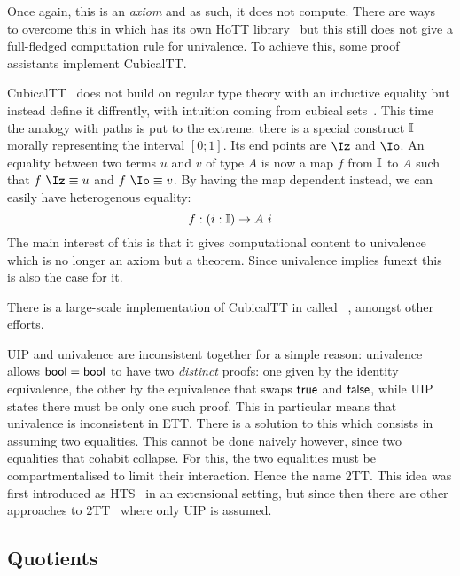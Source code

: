 Once again, this is an \emph{axiom} and as such, it does not compute.
There are ways~ to overcome this in
\Coq which has its own \acrshort{HoTT} library~
but this still does not give a full-fledged computation rule for univalence.
To achieve this, some proof assistants implement \acrlong{CubicalTT}.

 \acrshort{CubicalTT}~
does not build on regular type theory with an inductive equality but instead
define it diffrently, with intuition coming from cubical
sets~.
This time the analogy with paths is put to the extreme: there is a special
construct \(\mathbb{I}\) morally representing the interval \([0;1]\). Its end points
are \(\Iz\) and \(\Io\).
An equality between two terms \(u\) and \(v\) of type \(A\) is now a map \(f\)
from \(\mathbb{I}\) to \(A\) such that \(f\ \Iz \equiv u\) and \(f\ \Io \equiv v\).
By having the map dependent instead, we can easily have heterogenous equality:
\[
  f : (i : \mathbb{I}) \to A\ i
\]
The main interest of this is that it gives computational content to univalence
which is no longer an axiom but a theorem. Since univalence implies
\acrshort{funext} this is also the case for it.

There is a large-scale implementation of \acrshort{CubicalTT} in
\Agda called ~,
amongst other efforts.


\acrshort{UIP} and univalence are inconsistent together for a simple reason:
univalence allows \(\mathsf{bool} = \mathsf{bool}\) to have two \emph{distinct} proofs: one
given by the identity equivalence, the other by the equivalence that swaps
\(\mathsf{true}\) and \(\mathsf{false}\), while \acrshort{UIP} states there must be only one
such proof.
This in particular means that univalence is inconsistent in \acrshort{ETT}.
There is a solution to this which consists in assuming two equalities.
This cannot be done naively however, since two equalities that cohabit
collapse.
For this, the two equalities must be compartmentalised to limit their
interaction. Hence the name \acrfull{2TT}.
This idea was first introduced as \acrfull{HTS}~ in
an extensional setting, but since then there are other approaches to
\acrshort{2TT}~
where only \acrshort{UIP} is assumed.

\subsection{Quotients}

